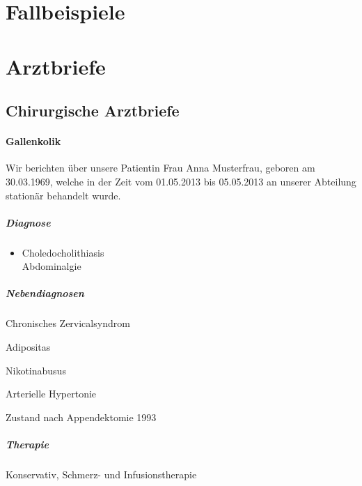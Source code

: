 
\chapter{Fallbeispiele}

\ChapterEnd

\chapter{Arztbriefe}

\section{Chirurgische Arztbriefe}

\subsubsection{Gallenkolik}


Wir berichten über unsere Patientin  Frau Anna Musterfrau,
geboren am 30.03.1969, welche in der Zeit vom
01.05.2013 bis 05.05.2013 an unserer Abteilung stationär
behandelt wurde.

\paragraph{Diagnose}
\begin{itemize}
  \item Choledocholithiasis\\
Abdominalgie
\end{itemize}


\paragraph{Nebendiagnosen}

\begin{compactitem}
  \item Chronisches Zervicalsyndrom
  \item Adipositas 
  \item Nikotinabusus 
  \item Arterielle Hypertonie 
  \item Zustand
nach Appendektomie 1993
\end{compactitem}

\paragraph{Therapie} Konservativ, Schmerz- und Infusionstherapie


